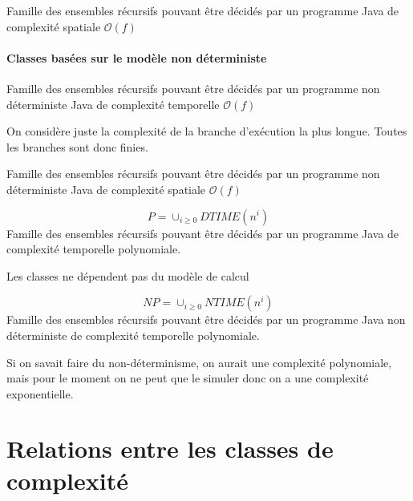 \begin{mydef}[DSPACE(f)]
	Famille des ensembles récursifs pouvant être décidés par un programme
	Java de complexité spatiale $\mathcal{O}(f)$
\end{mydef}

\paragraph{Classes basées sur le modèle non déterministe}
\begin{mydef}[NTIME(f)]
	Famille des ensembles récursifs pouvant être décidés par un programme
	non déterministe Java de complexité temporelle $\mathcal{O}(f)$
\end{mydef}

\begin{myrem}
	On considère juste la complexité de la branche d'exécution la plus
	longue. Toutes les branches sont donc finies.
\end{myrem}

\begin{mydef}[NSPACE(f)]
	Famille des ensembles récursifs pouvant être décidés par un programme
	non déterministe Java de complexité spatiale $\mathcal{O}(f)$
\end{mydef}

\begin{mydef}[Classe P]
	\[ P = \mathop{\cup}_{i \geq 0} DTIME(n^i)\]
	Famille des ensembles récursifs pouvant être décidés par un programme
	Java de complexité temporelle polynomiale.
\end{mydef}

\begin{myrem}
	Les classes ne dépendent pas du modèle de calcul
\end{myrem}

\begin{mydef}[Classe NP]
	\[ NP = \mathop{\cup}_{i \geq 0} NTIME(n^i)\]
	Famille des ensembles récursifs pouvant être décidés par un programme
	Java non déterministe de complexité temporelle polynomiale.
\end{mydef}

\begin{myrem}
	Si on savait faire du non-déterminisme, on aurait une complexité polynomiale,
	mais pour le moment on ne peut que le simuler donc on a une complexité
	exponentielle.
\end{myrem}

\section{Relations entre les classes de complexité}
\label{sub:relations_entre_les_classes_de_complexit_}

